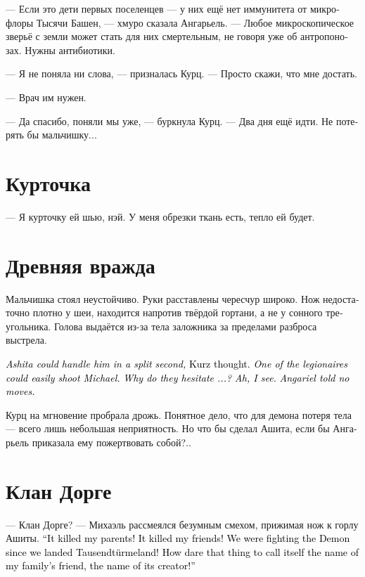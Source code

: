 \documentclass[a4paper,12pt,fleqn]{book}\usepackage{cooltooltips}\usepackage{polyglossia}\setdefaultlanguage[babelshorthands=true]{russian}\setotherlanguage{english}\defaultfontfeatures{Ligatures=TeX,Mapping=tex-text} \usepackage{xcolor}\definecolor{lightgray}{HTML}{bbbbbb}\color{lightgray}\newcommand{\ml}[3]{\textenglish{\textcolor{black}{#3}}}
\begin{document}
--- Если это дети первых поселенцев --- у них ещё нет иммунитета от микрофлоры Тысячи Башен, --- хмуро сказала Ангарьель.
--- Любое микроскопическое зверьё с земли может стать для них смертельным, не говоря уже об антропонозах.
Нужны антибиотики.

--- Я не поняла ни слова, --- призналась Курц.
--- Просто скажи, что мне достать.

--- Врач им нужен.

--- Да спасибо, поняли мы уже, --- буркнула Курц.
--- Два дня ещё идти.
Не потерять бы мальчишку...

\section{Курточка}

--- Я курточку ей шью, нэй.
У меня обрезки ткань есть, тепло ей будет.

\section{Древняя вражда}

Мальчишка стоял неустойчиво.
Руки расставлены чересчур широко.
Нож недостаточно плотно у шеи, находится напротив твёрдой гортани, а не у сонного треугольника.
Голова выдаётся из-за тела заложника за пределами разброса выстрела.

\ml{$0$}
{<<Ашита мог бы справиться с ним в долю секунды, --- думала Курц.}
{\textit{Ashita could handle him in a split second,} Kurz thought.}
\ml{$0$}
{--- Кто-то из легионеров может легко пристрелить Михаэля.}
{\textit{One of the legionaires could easily shoot Michael.}}
\ml{$0$}
{Почему же они медлят?..}
{\textit{Why do they hesitate ...?}}
\ml{$0$}
{А, ясно.}
{\textit{Ah, I see.}}
\ml{$0$}
{Ангарьель велела ничего не предпринимать>>.}
{\textit{Angariel told no moves.}}

Курц на мгновение пробрала дрожь.
Понятное дело, что для демона потеря тела --- всего лишь небольшая неприятность.
Но что бы сделал Ашита, если бы Ангарьель приказала ему пожертвовать собой?..

\section{Клан Дорге}

--- Клан Дорге? --- Михаэль рассмеялся безумным смехом, прижимая нож к горлу Ашиты.
\ml{$0$}
{--- Он убил моих родителей!}
{``It killed my parents!}
\ml{$0$}
{Он убил моих друзей!}
{It killed my friends!}
\ml{$0$}
{Мы вели с Демоном войну с того момента, как ступили на Таузендтурмеланд!}
{We were fighting the Demon since we landed Tausendt\"{u}rmeland!}
\ml{$0$}
{Как смеет это существо называться именем друга моей семьи, своего создателя?}
{How dare that thing to call itself the name of my family's friend, the name of its creator!''}
\end{document}
